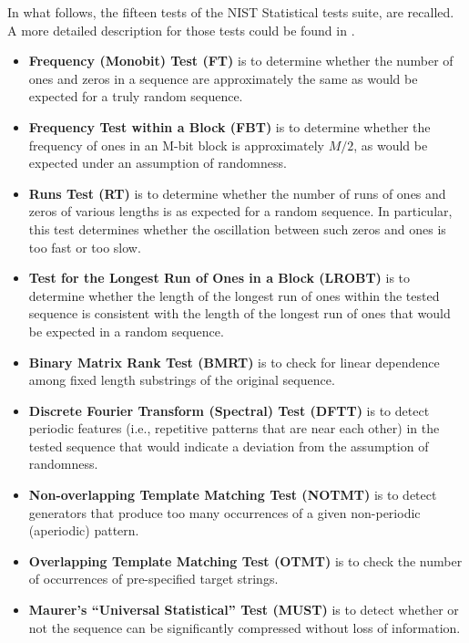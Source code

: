 In what follows, the fifteen tests of the NIST Statistical tests suite, are recalled. A more detailed description for those tests could be found in \cite{ANDREW2008}.
\begin{itemize}
\item \textbf{Frequency (Monobit) Test (FT)} is to determine whether the number of ones and zeros in a sequence are approximately the same as would be expected for a truly random sequence.


\item \textbf{Frequency Test within a Block (FBT)} is to determine whether the frequency of ones in an M-bit block is approximately $M/2$, as would be expected under an assumption of randomness. %


\item \textbf{Runs Test (RT)} is to determine whether the number of runs of ones and zeros of various lengths is as expected for a random sequence. In particular, this test determines whether the oscillation between such zeros and ones is too fast or too slow.


\item \textbf{Test for the Longest Run of Ones in a Block (LROBT)} is to determine whether the length of the longest run of ones within the tested sequence is consistent with the length of the longest run of ones that would be expected in a random sequence.


\item \textbf{Binary Matrix Rank Test (BMRT)} is to check for linear dependence among fixed length substrings of the original sequence.


\item \textbf{Discrete Fourier Transform (Spectral) Test (DFTT)} is to detect periodic features (i.e., repetitive patterns that are near each other) in the tested sequence that would indicate a deviation from the assumption of randomness.


\item \textbf{Non-overlapping Template Matching Test (NOTMT)} is to detect generators that produce too many occurrences of a given non-periodic (aperiodic) pattern.


\item \textbf{Overlapping Template Matching Test (OTMT)} is to check the number of occurrences of pre-specified target strings.

\item \textbf{Maurer's ``Universal Statistical'' Test (MUST)} is to detect whether or not the sequence can be
significantly compressed without loss of information.


\end{itemize}
